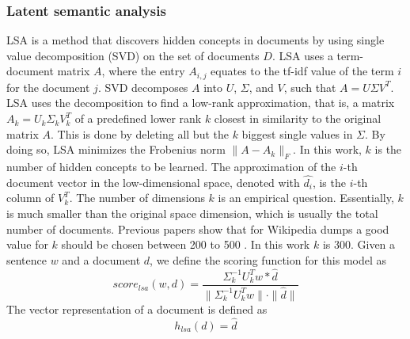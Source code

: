 \documentclass[a4paper]{article}
\begin{document}
\subsubsection{Latent semantic analysis}
LSA \cite{deerwester1990indexing} is a method that discovers hidden concepts in documents by using single value decomposition (SVD) on the set of documents $D$.
LSA uses a term-document matrix $A$, where the entry $A_{i,j}$ equates to the tf-idf value of the term $i$ for the document $j$. SVD decomposes $A$ into $U$, $\Sigma$, and $V$, such that $A = U \Sigma V^T$.
LSA uses the decomposition to find a low-rank approximation, that is, a matrix $A_k = U_k \Sigma_k V_k^T$ of a predefined lower rank $k$ closest in similarity to the original matrix $A$. This is done by deleting all but the $k$ biggest single values in $\Sigma$.
By doing so, LSA minimizes the Frobenius norm $\|A-A_k\|_F$. In this work, $k$ is the number of hidden concepts to be learned. The approximation of the $i$-th document vector in the low-dimensional space, denoted with $\hat{d_i}$, is the  $i$-th column of $V_k^T$.
The number of dimensions $k$ is an empirical question. Essentially, $k$ is much smaller than the original space dimension, which is usually the total number of documents. Previous papers show that for Wikipedia dumps a good value for $k$ should be chosen between 200 to 500 \cite{bradford2008empirical}. In this work $k$ is 300.
Given a sentence $w$ and a document $d$, we define the scoring function for this model as
\begin{equation}
\label{eq:score_lsi}
score_{lsa}(w, d) = \dfrac{\Sigma_k^{-1} U_k^T w * \hat{d}} {\|\Sigma_k^{-1} U_k^T w \| \cdot \| \hat{d}\|}
\end{equation}
The vector representation of a document is defined as
\begin{equation}
\label{eq:h_lsa}
h_{lsa}(d) = \hat{d}
\end{equation}
\end{document}
